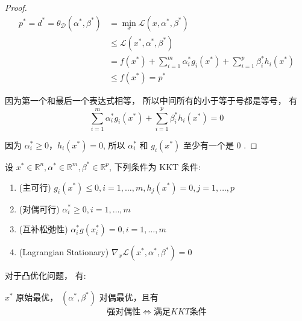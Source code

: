 \begin{proof}
    \begin{equation}
    \begin{aligned}
    p^{*}=d^{*}=\theta_{\mathcal{D}}\left(\alpha^{*}, \beta^{*}\right) &=\min _{x} \mathcal{L}\left(x, \alpha^{*}, \beta^{*}\right) \\
    & \leqslant \mathcal{L}\left(x^{*}, \alpha^{*}, \beta^{*}\right) \\
    &=f\left(x^{*}\right)+\sum_{i=1}^{m} \alpha_{i}^{*} g_{i}\left(x^{*}\right)+\sum_{i=1}^{p} \beta_{i}^{*} h_{i}\left(x^{*}\right) \\
    & \leqslant f\left(x^{*}\right)=p^{*}
    \end{aligned}
    \end{equation}

    因为第一个和最后一个表达式相等， 所以中间所有的小于等于号都是等号， 有 \begin{equation} \sum_{i=1}^{m} \alpha_{i}^{*} g_{i}\left(x^{*}\right)+\sum_{i=1}^{p} \beta_{i}^{*} h_{i}\left(x^{*}\right)=0 \end{equation}

    因为 $ \alpha_{i}^{*} \geqslant 0 ， h_{i}\left(x^{*}\right)=0 $, 所以 $ \alpha_{i}^{*} $ 和 $ g_{i}\left(x^{*}\right) $ 至少有一个是 0 .
\end{proof}

\begin{theorem}
    设 $ x^{*} \in \mathbb{R}^{n}, \alpha^{*} \in \mathbb{R}^{m}, \beta^{*} \in \mathbb{R}^{p} $, 下列条件为 $ \mathrm{KKT} $ 条件:

    \begin{enumerate}
        \item (主可行) $ g_{i}\left(x^{*}\right) \leqslant 0, i=1, \ldots, m, h_{j}\left(x^{*}\right)=0, j=1, \ldots, p $
        \item (对偶可行) $ \alpha_{i}^{*} \geqslant 0, i=1, \ldots, m $
        \item (互补松弛性) $ \alpha_{i}^{*} g\left(x_{i}^{*}\right)=0, i=1, \ldots, m $
        \item (Lagrangian Stationary) $ \nabla_{x} \mathcal{L}\left(x^{*}, \alpha^{*}, \beta^{*}\right)=0 $
    \end{enumerate}

\end{theorem}

\begin{theorem}
    对于凸优化问题， 有:

$ x^{*} $ 原始最优， $ \left(\alpha^{*}, \beta^{*}\right) $ 对偶最优，且有\begin{equation} 强对偶性 \Leftrightarrow  满足  K K T  条件\end{equation}
\end{theorem}

